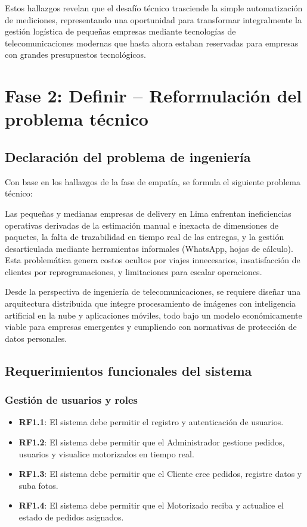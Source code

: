 Estos hallazgos revelan que el desafío técnico trasciende la simple automatización de mediciones, representando una oportunidad para transformar integralmente la gestión logística de pequeñas empresas mediante tecnologías de telecomunicaciones modernas que hasta ahora estaban reservadas para empresas con grandes presupuestos tecnológicos.

\section{Fase 2: Definir – Reformulación del problema técnico}

\subsection{Declaración del problema de ingeniería}

Con base en los hallazgos de la fase de empatía, se formula el siguiente problema técnico:

Las pequeñas y medianas empresas de delivery en Lima enfrentan ineficiencias operativas derivadas de la estimación manual e inexacta de dimensiones de paquetes, la falta de trazabilidad en tiempo real de las entregas, y la gestión desarticulada mediante herramientas informales (WhatsApp, hojas de cálculo). Esta problemática genera costos ocultos por viajes innecesarios, insatisfacción de clientes por reprogramaciones, y limitaciones para escalar operaciones.

Desde la perspectiva de ingeniería de telecomunicaciones, se requiere diseñar una arquitectura distribuida que integre procesamiento de imágenes con inteligencia artificial en la nube y aplicaciones móviles, todo bajo un modelo económicamente viable para empresas emergentes y cumpliendo con normativas de protección de datos personales.

\subsection{Requerimientos funcionales del sistema}

\subsubsection{Gestión de usuarios y roles}

\begin{itemize}
    \item \textbf{RF1.1}: El sistema debe permitir el registro y autenticación de usuarios.
    \item \textbf{RF1.2}: El sistema debe permitir que el Administrador gestione pedidos, usuarios y visualice motorizados en tiempo real.
    \item \textbf{RF1.3}: El sistema debe permitir que el Cliente cree pedidos, registre datos y suba fotos.
    \item \textbf{RF1.4}: El sistema debe permitir que el Motorizado reciba y actualice el estado de pedidos asignados.
\end{itemize}

